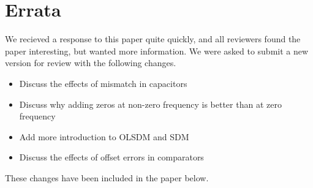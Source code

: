 \section*{Errata}
We recieved a response to this paper quite quickly, and all
reviewers found the paper interesting, but wanted more information. We
were asked to submit a new version for review with the following
changes. 
\begin{itemize}
\item Discuss the effects of mismatch in capacitors
\item Discuss why adding zeros at non-zero frequency is better than at
  zero frequency
\item Add more introduction to OLSDM and SDM
\item Discuss the effects of offset errors in comparators
\end{itemize}
These changes have been included in the paper below.




